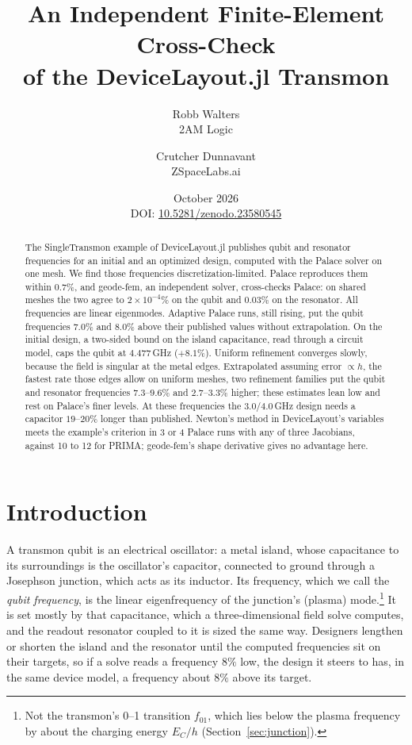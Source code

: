 \documentclass{anvil-paper}
\title{An Independent Finite-Element Cross-Check\\of the DeviceLayout.jl Transmon}
\author{Robb Walters\\
  {\normalsize 2AM Logic}
  \and Crutcher Dunnavant\\
  {\normalsize ZSpaceLabs.ai}}
\date{October 2026\\[0.5ex]
  {\normalsize DOI: \href{https://doi.org/10.5281/zenodo.23580545}{10.5281/zenodo.23580545}}}
\begin{document}
\maketitle

\begin{abstract}
The SingleTransmon example of DeviceLayout.jl publishes qubit and
resonator frequencies for an initial and an optimized design, computed
with the Palace solver on one mesh. We find those
frequencies discretization-limited. Palace reproduces them within
$0.7\%$, and geode-fem, an independent solver, cross-checks Palace: on
shared meshes the two agree to $2\times10^{-4}\%$ on the qubit and
$0.03\%$ on the resonator. All frequencies are linear eigenmodes. Adaptive
Palace runs, still rising, put the qubit frequencies $7.0\%$ and $8.0\%$ above their
published values without extrapolation. On the initial design, a two-sided
bound on the island capacitance, read through a circuit model, caps the
qubit at $4.477$\,GHz ($+8.1\%$). Uniform refinement converges slowly, because the field is singular at the metal edges.
Extrapolated assuming error $\propto h$, the fastest rate those edges allow on uniform meshes, two refinement families put the qubit and
resonator frequencies $7.3$--$9.6\%$ and $2.7$--$3.3\%$ higher; these estimates lean low and rest on
Palace's finer levels. At these frequencies the $3.0$/$4.0$\,GHz
design needs a capacitor $19$--$20\%$ longer than published. Newton's
method in DeviceLayout's variables meets the example's criterion in 3 or
4 Palace runs with any of three Jacobians, against 10 to 12 for PRIMA;
geode-fem's shape derivative gives no advantage here.
\end{abstract}

\section{Introduction}
\label{sec:intro}

A transmon qubit is an electrical oscillator: a metal island, whose
capacitance to its surroundings is the oscillator's capacitor, connected
to ground through a Josephson junction, which acts as its inductor. Its
frequency, which we call the \emph{qubit frequency}, is the linear
eigenfrequency of the junction's (plasma) mode.\footnote{Not the
transmon's 0--1 transition $f_{01}$, which lies below the plasma frequency
by about the charging energy $E_C/h$ (Section~\ref{sec:junction}).} It is
set mostly by that capacitance, which a three-dimensional field solve
computes, and the readout resonator coupled to it is sized the same way. Designers lengthen or shorten the island and the resonator until
the computed frequencies sit on their targets, so if a solve reads a
frequency $8\%$ low, the design it steers to has, in the same device
model, a frequency about $8\%$ above its target.
\end{document}
